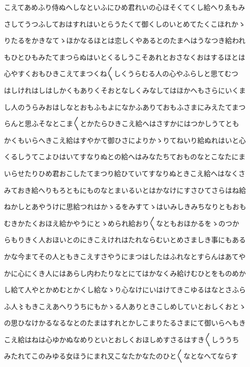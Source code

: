 \documentclass[a4paper,11pt,landscape]{ltjtarticle}
\begin{document}
こえてあめふり侍ぬへしなといふにひめ君れいの心ほそくてくし給へりゑもみ
\par\medskip
さしてうつふしておはすれはいとらうたくて御くしのいとめてたくこほれかゝ
\par\medskip
りたるをかきなてゝほかなるほとは恋しくやあるとのたまへはうなつき給われ
\par\medskip
もひとひもみたてまつらぬはいとくるしうこそあれとおさなくおはするほとは
\par\medskip
心やすくおもひきこえてまつくね〱しくうらむる人の心やふらしと思てむつ
\par\medskip
はしけれはしはしかくもありくそおとなしくみなしてはほかへもさらにいくま
\par\medskip
し人のうらみおはしなとおもふもよになかふありておもふさまにみえたてまつ
\par\medskip
らんと思ふそなとこま〱とかたらひきこえ給へはさすかにはつかしうてとも
\par\medskip
かくもいらへきこえ給はすやかて御ひさによりかゝりてねいり給ぬれはいと心
\par\medskip
くるしうてこよひはいてすなりぬとの給へはみなたちておものなとこなたにま
\par\medskip
いらせたりひめ君おこしたてまつり給ひていてすなりぬときこえ給へはなくさ
\par\medskip
みておき給へりもろともにものなとまいるいとはかなけにすさひてさらはね給
\par\medskip
ねかしとあやうけに思給つれはかゝるをみすてゝはいみしきみちなりともおも
\par\medskip
むきかたくおほえ給かやうにとゝめられ給おり〱なともおほかるをゝのつか
\par\medskip
らもりきく人おほいとのにきこえけれはたれならむいとめさましき事にもある
\par\medskip
かな今まてその人ともきこえすさやうにまつはしたはふれなとすらんはあてや
\par\medskip
かに心にくき人にはあらし内わたりなとにてはかなくみ給けむひとをものめか
\par\medskip
し給て人やとかめむとかくし給なゝり心なけにいはけてきこゆるはなとさふら
\par\medskip
ふ人〻もきこえあへりうちにもかゝる人ありときこしめしていとおしくおとゝ
\par\medskip
の思ひなけかるなるなとのたまはすれとかしこまりたるさまにて御いらへもき
\par\medskip
こえ給はねは心ゆかぬなめりといとおしくおほしめすさるはすき〱しううち
\par\medskip
みたれてこのみゆる女ほうにまれ又こなたかなたのひと〱なとなへてならす
\end{document}
